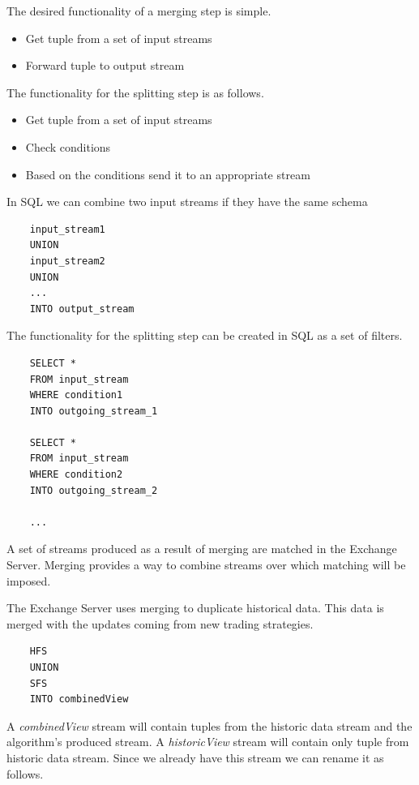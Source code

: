 \documentclass{article}
\begin{document}

The desired functionality of a merging step is simple.
\begin{itemize}
    \item Get tuple from a set of input streams
    \item Forward tuple to output stream
\end{itemize}

\noindent The functionality for the splitting step is as follows.

\begin{itemize}
    \item Get tuple from a set of input streams
    \item Check conditions
    \item Based on the conditions send it to an appropriate stream
\end{itemize}

\noindent In SQL we can combine two input streams if they have the same schema 

\begin{verbatim}   
    input_stream1
    UNION
    input_stream2
    UNION
    ...
    INTO output_stream
\end{verbatim}

\noindent The functionality for the splitting step can be created in SQL as a set of filters. 

\begin{verbatim}   
    SELECT * 
    FROM input_stream
    WHERE condition1
    INTO outgoing_stream_1
    
    SELECT * 
    FROM input_stream
    WHERE condition2
    INTO outgoing_stream_2
    
    ...
\end{verbatim}


A set of streams produced as a result of merging are matched in the Exchange Server. Merging provides a way to combine streams over which matching will be imposed. 

The Exchange Server uses merging to duplicate historical data. This data is merged with the updates coming from new trading strategies.

\begin{verbatim}  
    HFS
    UNION
    SFS
    INTO combinedView
\end{verbatim}

\noindent A \emph{combinedView} stream will contain tuples from the historic data stream and the algorithm's produced stream. A \emph{historicView} stream will contain only tuple from historic data stream. Since we already have this stream we can rename it as follows.
\end{document}
